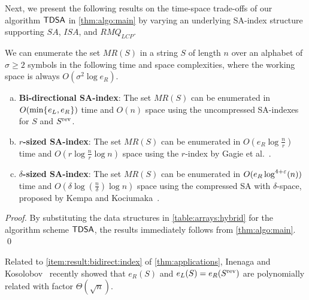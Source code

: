 Next, we present the following results on the time-space trade-offs of our algorithm $\textsf{TDSA}$ in \cref{thm:algo:main} by varying an underlying SA-index structure supporting $SA$, $ISA$, and $RMQ_{LCP}$.


\begin{theoremrep}\label{thm:applications}
  We can enumerate the set $MR(S)$
  in a string $S$ of length $n$ over an alphabet of $\sigma\ge 2$ symbols in the following time and space complexities, where the working space is always $O(\sigma^2 \log e_R)$. 
\newcommand{\mylistheading}{\textbf}
  \begin{enumerate}[(a)]

\item \mylistheading{Bi-directional SA-index}:    
  The set $MR(S)$ can be enumerated in $O(\min\{\kern0.05eme_L, e_R\kern0.05em\})$ time and $O(n)$ space using the uncompressed SA-indexes for $S$ and $S^{\mathrm{rev}}$. 
  \label{item:result:bidirect:index}
    
  \item \mylistheading{$r$-sized SA-index}:
    The set $MR(S)$  can be enumerated in $O(e_R \log {\frac n r})$ time and $O(r\log {\frac n r}\log n)$ space using the $r$-index by
    Gagie et al.~\cite{gagie:navarro:prezza2020fully}.
      \label{item:result:compressed:r:index}    
    
  \item \mylistheading{$\delta$-sized SA-index}:
    The set $MR(S)$ can be enumerated in $O(e_R \log^{4+\varepsilon}(n))$ time and $O(\delta\log({\frac n \delta}) \log n)$ space using the compressed SA with $\delta$-space, proposed by Kempa and Kociumaka~\cite{kempa:kociumaka2023collapsing}.
          \label{item:result:compressed:delta:index}
  \end{enumerate}
\end{theoremrep}

\begin{proof}
By substituting the data structures in \cref{table:arrays:hybrid} for the algorithm scheme $\textsf{TDSA}$, the results immediately follows from \cref{thm:algo:main}. \qed
\end{proof}

Related to \ref{item:result:bidirect:index} of \cref{thm:applications}, Inenaga and Kosolobov~\cite{inenaga:kosolobov2024relating:left:right} recently showed that $e_R(S)$ and $e_L(S)= e_R(S^{\mathrm{rev}})$ are polynomially related with factor $\Theta(\sqrt{n})$. 


